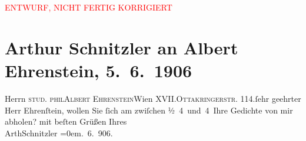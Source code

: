 
\begin{center}
            \textcolor{red}{ENTWURF, NICHT FERTIG KORRIGIERT}
                      \end{center}
            
         
         \renewcommand{\erwaehntePersonen}{Personen: Albert Ehrenstein}
         \renewcommand{\erwaehnteOrte}{Orte: Ottakringerstraße, Wien, XVII., Hernals, XVIII., Währing}
         \renewcommand{\erwaehnteWerke}{}
               \section[Arthur Schnitzler an Albert Ehrenstein, 5. 6. 1906]{ Arthur Schnitzler an Albert Ehrenstein, 5. 6. 1906}\nopagebreak{}\rehead{ }\begin{ledgroupsized}[t]{13cm}\normalsize\beginnumbering \toendnotes[C]{\smallbreak\pagebreak[2]} 
\toendnotes[C]{\smallbreak}\pstart{}{\pb}Herrn \textsc{stud.
                     phil}\pend{}\pstart{}\textsc{Albert Ehrenstein}\pend{}\pstart{}Wien XVII.\pend{}\pstart{}\textsc{Ottakringerstr.
                  114}.\pend{}{\bigskip}\pstart{}{\pb}ſehr geehrter Herr
                  Ehrenſtein,\pend\pstart
           wollen Sie ſich am \label{K_L02796-1v}\label{K_L02796-1h} zwiſchen
               ½ 4 und 4 Ihre Gedichte von mir abholen?\pend
           \pstart
           mit beſten Grüßen Ihres{\\[\baselineskip]}\spacefill\mbox{ArthSchnitzler}\pend
           \leftskip=0em{}. 6. 906.\pend
           
         
         \endnumbering{}\end{ledgroupsized}  \newcommand{\dateiname}{L02796}\newcommand{\titel}{Arthur Schnitzler an Albert Ehrenstein, 5. 6. 1906}\newcommand{\editorInnen}{Martin Anton Müller und Gerd-Hermann Susen}
      